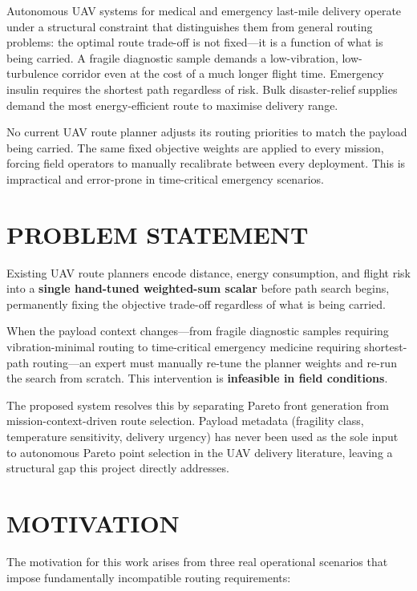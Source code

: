 Autonomous UAV systems for medical and emergency last-mile delivery operate under a
structural constraint that distinguishes them from general routing problems: the optimal
route trade-off is not fixed---it is a function of what is being carried. A fragile
diagnostic sample demands a low-vibration, low-turbulence corridor even at the cost of
a much longer flight time. Emergency insulin requires the shortest path regardless of
risk. Bulk disaster-relief supplies demand the most energy-efficient route to maximise
delivery range.

No current UAV route planner adjusts its routing priorities to match the payload being
carried. The same fixed objective weights are applied to every mission, forcing field
operators to manually recalibrate between every deployment. This is impractical and
error-prone in time-critical emergency scenarios.

\section{PROBLEM STATEMENT}

Existing UAV route planners encode distance, energy consumption, and flight risk into a
\textbf{single hand-tuned weighted-sum scalar} before path search begins, permanently
fixing the objective trade-off regardless of what is being carried.

When the payload context changes---from fragile diagnostic samples requiring
vibration-minimal routing to time-critical emergency medicine requiring shortest-path
routing---an expert must manually re-tune the planner weights and re-run the search from
scratch. This intervention is \textbf{infeasible in field conditions}.

The proposed system resolves this by separating Pareto front generation from
mission-context-driven route selection. Payload metadata (fragility class, temperature
sensitivity, delivery urgency) has never been used as the sole input to autonomous Pareto
point selection in the UAV delivery literature, leaving a structural gap this project
directly addresses.

\section{MOTIVATION}

The motivation for this work arises from three real operational scenarios that impose
fundamentally incompatible routing requirements:

